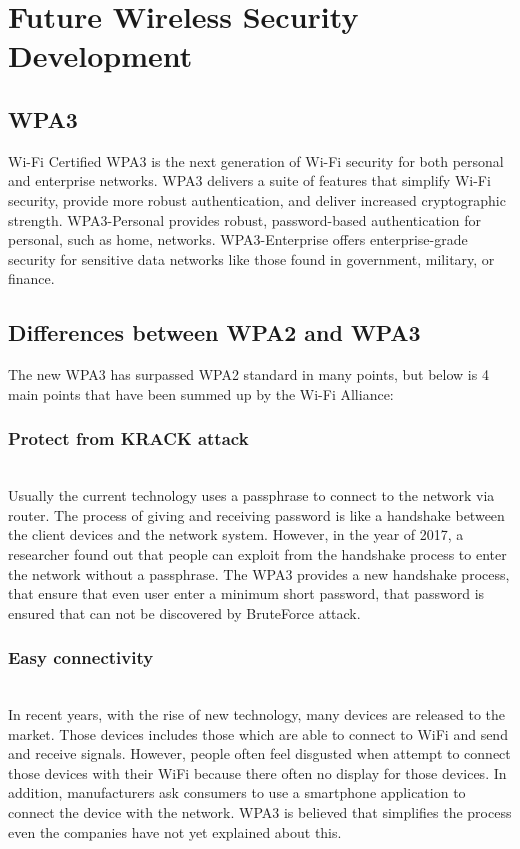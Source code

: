 \section{Future Wireless Security Development}
\subsection{WPA3}
Wi-Fi Certified WPA3 is the next generation of Wi-Fi security for both personal and enterprise networks. WPA3 delivers a suite of features that simplify Wi-Fi security, provide more robust authentication, and deliver increased cryptographic strength. WPA3-Personal provides robust, password-based authentication for personal, such as home, networks. WPA3-Enterprise offers enterprise-grade security for sensitive data networks like those found in government, military, or finance. \cite{kinney_2018}
\subsection{Differences between WPA2 and WPA3}
The new WPA3 has surpassed WPA2 standard in many points, but below is 4 main points that have been summed up by the Wi-Fi Alliance:
\subsubsection{Protect from KRACK attack}~\\
Usually the current technology uses a passphrase to connect to the network via router. The process of giving and receiving password is like a handshake between the client devices and the network system. However, in the year of 2017, a researcher found out that people can exploit from the handshake process to enter the network without a passphrase.
The WPA3 provides a new handshake process, that ensure that even user enter a minimum short password, that password is ensured that can not be discovered by BruteForce attack. \cite{wiggers_2018}
\subsubsection{Easy connectivity}~\\
In recent years, with the rise of new technology, many devices are released to the market. Those devices includes those which are able to connect to WiFi and send and receive signals. However, people often feel disgusted when attempt to connect those devices with their WiFi because there often no display for those devices. In addition, manufacturers ask consumers to use a smartphone application to connect the device with the network.
WPA3 is believed that simplifies the process even the companies have not yet explained about this. \cite{kinney_2018}
